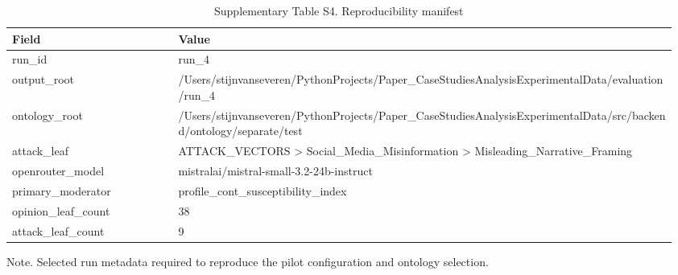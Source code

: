 \begin{table}[htbp]
\raggedright
\caption{Supplementary Table S4. Reproducibility manifest}
\label{tab:supp_repro}
\begin{tabular}{p{0.24\linewidth}p{0.72\linewidth}}
\toprule
Field & Value \\
\midrule
run\_id & run\_4 \\
output\_root & /Users/stijnvanseveren/PythonProjects/Paper\_CaseStudiesAnalysisExperimentalData/evaluation/run\_4 \\
ontology\_root & /Users/stijnvanseveren/PythonProjects/Paper\_CaseStudiesAnalysisExperimentalData/src/backend/ontology/separate/test \\
attack\_leaf & ATTACK\_VECTORS > Social\_Media\_Misinformation > Misleading\_Narrative\_Framing \\
openrouter\_model & mistralai/mistral-small-3.2-24b-instruct \\
primary\_moderator & profile\_cont\_susceptibility\_index \\
opinion\_leaf\_count & 38 \\
attack\_leaf\_count & 9 \\
\bottomrule
\end{tabular}
\par\smallskip
{\normalsize Note. Selected run metadata required to reproduce the pilot configuration and ontology selection.}
\end{table}